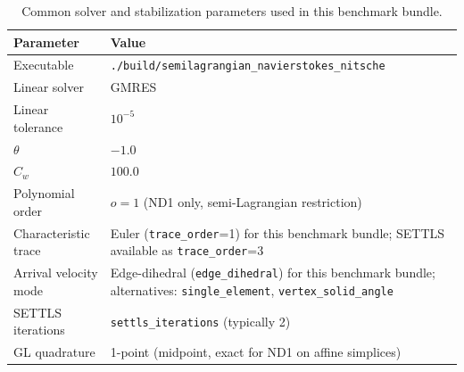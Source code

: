 \documentclass[11pt]{article}
\begin{document}
\begin{table}[H]
	\centering
	\begin{tabularx}{\textwidth}{@{}lX@{}}
		\toprule
		Parameter             & Value                                                                                                                                    \\
		\midrule
		Executable            & \texttt{./build/semilagrangian\_navierstokes\_nitsche}                                                                                   \\
		Linear solver         & GMRES                                                                                                                                    \\
		Linear tolerance      & $10^{-5}$                                                                                                                                \\
		$\theta$              & $-1.0$                                                                                                                                   \\
		$C_w$                 & $100.0$                                                                                                                                  \\
		Polynomial order      & $o=1$ (ND1 only, semi-Lagrangian restriction)                                                                                            \\
		Characteristic trace  & Euler (\texttt{trace\_order}=1) for this benchmark bundle; SETTLS available as \texttt{trace\_order}=3                                   \\
		Arrival velocity mode & Edge-dihedral (\texttt{edge\_dihedral}) for this benchmark bundle; alternatives: \texttt{single\_element}, \texttt{vertex\_solid\_angle} \\
		SETTLS iterations     & \texttt{settls\_iterations} (typically 2)                                                                                                \\
		GL quadrature         & 1-point (midpoint, exact for ND1 on affine simplices)                                                                                    \\
		\bottomrule
	\end{tabularx}
	\caption{Common solver and stabilization parameters used in this benchmark bundle.}
\end{table}
\end{document}
